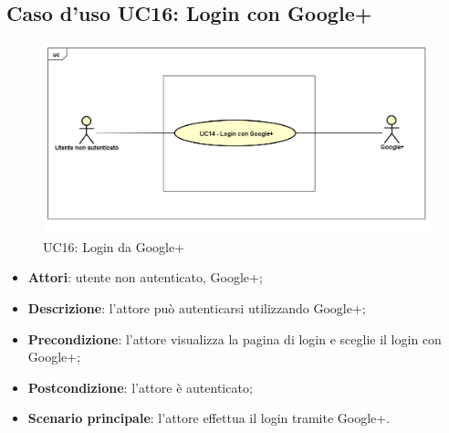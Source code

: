 \newpage
\subsection{Caso d'uso UC16: Login con Google+}
\label{UC16}
\begin{figure}[ht]
	\centering
	\includegraphics[scale=0.48]{UML/UC16.png}
	\caption{UC16: Login da Google+}
\end{figure}
\FloatBarrier
\begin{itemize}
	\item \textbf{Attori}: utente non autenticato, Google+;
	\item \textbf{Descrizione}: l'attore può autenticarsi utilizzando Google+;
	\item \textbf{Precondizione}: l'attore visualizza la pagina di login e sceglie il login con Google+;
	\item \textbf{Postcondizione}: l'attore è autenticato;
	\item \textbf{Scenario principale}: l'attore effettua il login tramite Google+.
\end{itemize}
